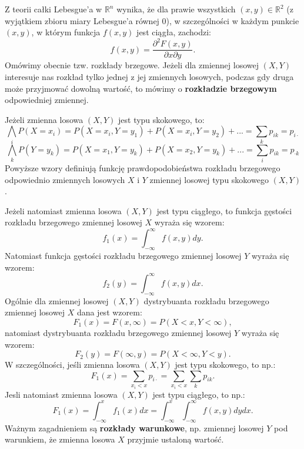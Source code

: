 \documentclass[10pt,a4paper]{article}
\begin{document}
Z teorii całki Lebesgue'a w $\mathbb{R}^n$ wynika, że dla prawie wszystkich $(x,y)\in\mathbb{R}^2$ (z wyjątkiem zbioru miary Lebesgue'a równej 0), w szczególności w każdym
 punkcie $(x,y)$, w którym funkcja $f(x,y)$ jest ciągła, zachodzi:
\begin{equation}
f(x,y)=\frac{\partial^2F(x,y)}{\partial x\partial y}.
\end{equation}
Omówimy obecnie tzw. rozkłady brzegowe. Jeżeli dla zmiennej losowej $(X,Y)$ interesuje nas rozkład tylko jednej z jej zmiennych losowych, podczas gdy druga może przyjmować
dowolną wartość, to mówimy o \textbf{rozkładzie brzegowym} odpowiedniej zmiennej.

Jeżeli zmienna losowa $(X,Y)$ jest typu skokowego, to:
\[\bigwedge_iP(X=x_i)=P(X=x_i,Y=y_1)+P(X=x_i,Y=y_2)+... = \sum_kp_{ik}=p_{i\cdot}\]
\[\bigwedge_kP(Y=y_k)=P(X=x_1,Y=y_k)+P(X=x_2,Y=y_k)+... = \sum_ip_{ik}=p_{\cdot k}\]
Powyższe wzory definiują funkcję prawdopodobieństwa rozkładu brzegowego odpowiednio zmiennych losowych $X$ i $Y$ zmiennej losowej typu
skokowego $(X,Y)$.

Jeżeli natomiast zmienna losowa $(X,Y)$ jest typu ciągłego, to funkcja gęstości rozkładu brzegowego zmiennej losowej $X$ wyraża się wzorem:
\[f_1(x) = \int_{-\infty}^{\infty}f(x,y)dy.\]
Natomiast funkcja gęstości rozkładu brzegowego zmiennej losowej $Y$ wyraża się wzorem:
\[f_2(y) = \int_{-\infty}^{\infty}f(x,y)dx.\]
Ogólnie dla zmiennej losowej $(X,Y)$ dystrybuanta rozkładu brzegowego zmiennej losowej $X$ dana jest wzorem:
\[F_1(x) = F(x,\infty) = P(X<x,Y<\infty),\]
natomiast dystrybuanta rozkładu brzegowego zmiennej losowej $Y$ wyraża się wzorem:
\[F_2(y) = F(\infty,y) = P(X<\infty,Y<y).\]
W szczególności, jeśli zmienna losowa $(X,Y)$ jest typu skokowego, to np.:
\[F_1(x) = \sum_{x_i<x}p_{i\cdot}=\sum_{x_i<x}\sum_kp_{ik}.\]
Jesli natomiast zmienna losowa $(X,Y)$ jest typu ciągłego, to np.:
\[F_1(x) = \int_{-\infty}^xf_1(x)dx = \int_{-\infty}^x\int_{-\infty}^{\infty}f(x,y)dydx.\]
Ważnym zagadnieniem są \textbf{rozkłady warunkowe}, np. zmiennej losowej $Y$ pod warunkiem, że zmienna losowa $X$ przyjmie ustaloną wartość. 
\end{document}
